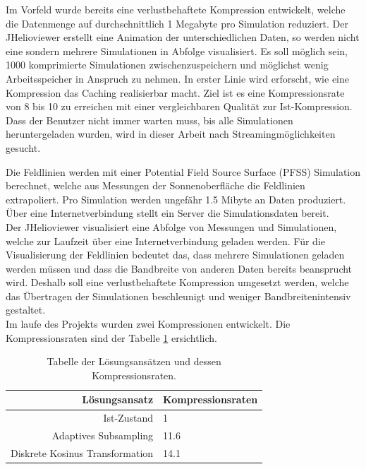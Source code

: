 Im Vorfeld wurde bereits eine verlustbehaftete Kompression entwickelt, welche die Datenmenge auf durchschnittlich 1 Megabyte pro Simulation reduziert. Der JHelioviewer erstellt eine Animation der unterschiedlichen Daten, so werden nicht eine sondern mehrere Simulationen in Abfolge visualisiert. Es soll möglich sein, 1000 komprimierte Simulationen zwischenzuspeichern und möglichst wenig Arbeitsspeicher in Anspruch zu nehmen. In erster Linie wird erforscht, wie eine Kompression das Caching realisierbar macht. Ziel ist es eine Kompressionsrate von 8 bis 10 zu erreichen mit einer vergleichbaren Qualität zur Ist-Kompression.\\
Dass der Benutzer nicht immer warten muss, bis alle Simulationen heruntergeladen wurden, wird in dieser Arbeit nach Streamingmöglichkeiten gesucht.

Die Feldlinien werden mit einer Potential Field Source Surface (PFSS) Simulation berechnet, welche aus Messungen der Sonnenoberfläche die Feldlinien extrapoliert. Pro Simulation werden ungefähr 1.5 Mibyte an Daten produziert. Über eine Internetverbindung stellt ein Server die Simulationsdaten bereit.\\
Der JHelioviewer visualisiert eine Abfolge von Messungen und Simulationen, welche zur Laufzeit über eine Internetverbindung geladen werden. Für die Visualisierung der Feldlinien bedeutet das, dass mehrere Simulationen geladen werden müssen und dass die Bandbreite von anderen Daten bereits beansprucht wird. Deshalb soll eine verlustbehaftete Kompression umgesetzt werden, welche das Übertragen der Simulationen beschleunigt und weniger Bandbreitenintensiv gestaltet.\\
[\baselineskip]
Im laufe des Projekts wurden zwei Kompressionen entwickelt. Die Kompressionsraten sind der Tabelle \ref{einleitung:tabelle} ersichtlich.
\begin{table}[!htbp]
	\center
	\begin{tabular}{r|l}
		Lösungsansatz & Kompressionsraten \\\hline
		Ist-Zustand & 1\\
		Adaptives Subsampling & 11.6 \\
		Diskrete Kosinus Transformation & 14.1 \\
	\end{tabular}
	\caption{Tabelle der Lösungsansätzen und dessen Kompressionsraten.}
	\label{einleitung:tabelle}
\end{table}

